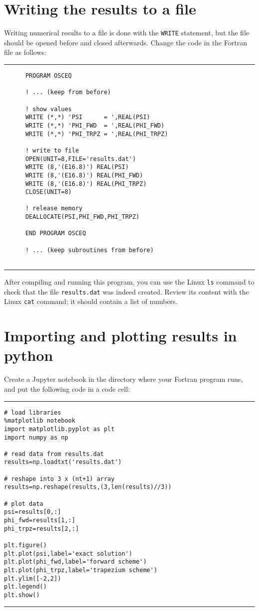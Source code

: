 \documentclass[a4paper]{article}
\begin{document}
\section{Writing the results to a file}
%
\par
Writing numerical results to a file is done with the \texttt{WRITE} statement, but the file should be opened before and closed afterwards. Change the code in the Fortran file as follows:
%
{\vspace{10pt}\hrule\small\vspace*{-2pt}\begin{verbatim}
	  PROGRAM OSCEQ
	  
	  ! ... (keep from before)
	  
	  ! show values
	  WRITE (*,*) 'PSI      = ',REAL(PSI)
	  WRITE (*,*) 'PHI_FWD  = ',REAL(PHI_FWD)
	  WRITE (*,*) 'PHI_TRPZ = ',REAL(PHI_TRPZ)
	  
	  ! write to file
	  OPEN(UNIT=8,FILE='results.dat')
	  WRITE (8,'(E16.8)') REAL(PSI)
	  WRITE (8,'(E16.8)') REAL(PHI_FWD)
	  WRITE (8,'(E16.8)') REAL(PHI_TRPZ)
	  CLOSE(UNIT=8)

	  ! release memory
	  DEALLOCATE(PSI,PHI_FWD,PHI_TRPZ)

	  END PROGRAM OSCEQ

      ! ... (keep subroutines from before)
	  
\end{verbatim}\hrule\vspace{5pt}}
%
After compiling and running this program, you can use the Linux \verb+ls+ command to check that the file \texttt{results.dat} was indeed created. Review its content with the Linux \verb+cat+ command; it should contain a list of numbers.
%
\section{Importing and plotting results in python}
%
\par
Create a Jupyter notebook in the directory where your Fortran program runs, and put the following code in a code cell:
{\vspace{10pt}\hrule\small\vspace*{-2pt}\begin{verbatim}
# load libraries
%matplotlib notebook
import matplotlib.pyplot as plt
import numpy as np

# read data from results.dat
results=np.loadtxt('results.dat')

# reshape into 3 x (nt+1) array
results=np.reshape(results,(3,len(results)//3))

# plot data
psi=results[0,:]
phi_fwd=results[1,:]
phi_trpz=results[2,:]

plt.figure()
plt.plot(psi,label='exact solution')
plt.plot(phi_fwd,label='forward scheme')
plt.plot(phi_trpz,label='trapezium scheme')
plt.ylim([-2,2])
plt.legend()
plt.show()	  
\end{verbatim}\hrule\vspace{5pt}}
%
\end{document}
